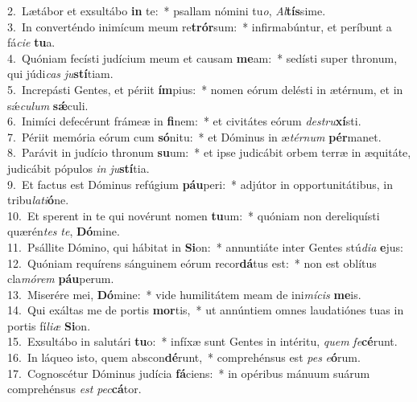 {2.~}Lætábor et exsultábo \textbf{in} te:~* psallam nómini tu\textit{o}, \textit{Al}\textbf{tís}sime.\\
{3.~}In converténdo inimícum meum re\textbf{trór}sum:~* infirmabúntur, et períbunt a fá\textit{ci}\textit{e} \textbf{tu}a.\\
{4.~}Quóniam fecísti judícium meum et causam \textbf{me}am:~* sedísti super thronum, qui júdi\textit{cas} \textit{ju}\textbf{stí}tiam.\\
{5.~}Increpásti Gentes, et périit \textbf{ím}pius:~* nomen eórum delésti in ætérnum, et in sǽ\textit{cu}\textit{lum} \textbf{sǽ}culi.\\
{6.~}Inimíci defecérunt frámeæ in \textbf{fi}nem:~* et civitátes eórum \textit{de}\textit{stru}\textbf{xí}sti.\\
{7.~}Périit memória eórum cum \textbf{só}nitu:~* et Dóminus in æ\textit{tér}\textit{num} \textbf{pér}manet.\\
{8.~}Parávit in judício thronum \textbf{su}um:~* et ipse judicábit orbem terræ in æquitáte, judicábit pópulos \textit{in} \textit{ju}\textbf{stí}tia.\\
{9.~}Et factus est Dóminus refúgium \textbf{páu}peri:~* adjútor in opportunitátibus, in tribu\textit{la}\textit{ti}\textbf{ó}ne.\\
{10.~}Et sperent in te qui novérunt nomen \textbf{tu}um:~* quóniam non dereliquísti quærén\textit{tes} \textit{te}, \textbf{Dó}mine.\\
{11.~}Psállite Dómino, qui hábitat in \textbf{Si}on:~* annuntiáte inter Gentes stú\textit{di}\textit{a} \textbf{e}jus:\\
{12.~}Quóniam requírens sánguinem eórum recor\textbf{dá}tus est:~* non est oblítus cla\textit{mó}\textit{rem} \textbf{páu}perum.\\
{13.~}Miserére mei, \textbf{Dó}mine:~* vide humilitátem meam de ini\textit{mí}\textit{cis} \textbf{me}is.\\
{14.~}Qui exáltas me de portis \textbf{mor}tis,~* ut annúntiem omnes laudatiónes tuas in portis fí\textit{li}\textit{æ} \textbf{Si}on.\\
{15.~}Exsultábo in salutári \textbf{tu}o:~* infíxæ sunt Gentes in intéritu, \textit{quem} \textit{fe}\textbf{cé}runt.\\
{16.~}In láqueo isto, quem abscon\textbf{dé}runt,~* comprehénsus est \textit{pes} \textit{e}\textbf{ó}rum.\\
{17.~}Cognoscétur Dóminus judícia \textbf{fá}ciens:~* in opéribus mánuum suárum comprehénsus \textit{est} \textit{pec}\textbf{cá}tor.\\
